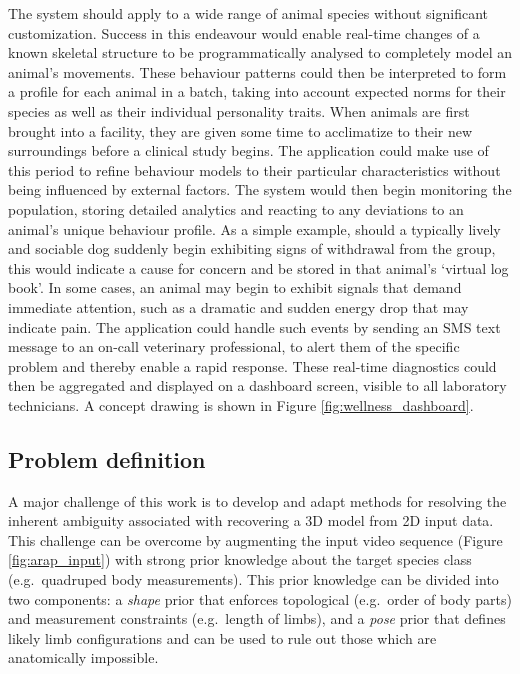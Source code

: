 The system should apply to a wide range of animal species without significant customization. Success in this endeavour would enable real-time changes of a known skeletal structure to be programmatically analysed to completely model an animal’s movements. These behaviour patterns could then be interpreted to form a profile for each animal in a batch, taking into account expected norms for their species as well as their individual personality traits. When animals are first brought into a facility, they are given some time to acclimatize to their new surroundings before a clinical study begins. The application could make use of this period to refine behaviour models to their particular characteristics without being influenced by external factors. The system would then begin monitoring the population, storing detailed analytics and reacting to any deviations to an animal’s unique behaviour profile. As a simple example, should a typically lively and sociable dog suddenly begin exhibiting signs of withdrawal from the group, this would indicate a cause for concern and be stored in that animal’s ‘virtual log book’. In some cases, an animal may begin to exhibit signals that demand immediate attention, such as a dramatic and sudden energy drop that may indicate pain. The application could handle such events by sending an SMS text message to an on-call veterinary professional, to alert them of the specific problem and thereby enable a rapid response. These real-time diagnostics could then be aggregated and displayed on a dashboard screen, visible to all laboratory technicians. A concept drawing is shown in Figure \ref{fig:wellness_dashboard}.

\subsection{Problem definition}
    A major challenge of this work is to develop and adapt methods for resolving the inherent ambiguity associated with recovering a 3D model from 2D input data. This challenge can be overcome by augmenting the input video sequence (Figure \ref{fig:arap_input}) with strong prior knowledge about the target species class (e.g.\ quadruped body measurements). This prior knowledge can be divided into two components: a \emph{shape} prior that enforces topological (e.g.\ order of body parts) and measurement constraints (e.g.\ length of limbs), and a \emph{pose} prior that defines likely limb configurations and can be used to rule out those which are anatomically impossible.

